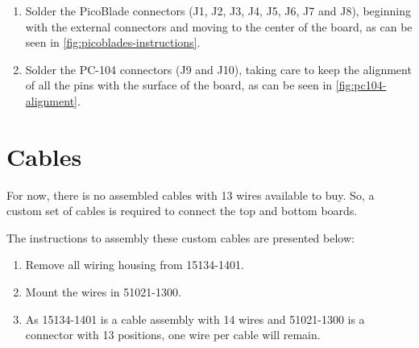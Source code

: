 \begin{enumerate}
    \item Solder the PicoBlade connectors (J1, J2, J3, J4, J5, J6, J7 and J8), beginning with the external connectors and moving to the center of the board, as can be seen in \autoref{fig:picoblades-instructions}.
    \item Solder the PC-104 connectors (J9 and J10), taking care to keep the alignment of all the pins with the surface of the board, as can be seen in \autoref{fig:pc104-alignment}.
\end{enumerate}

\section{Cables}

For now, there is no assembled cables with 13 wires available to buy. So, a custom set of cables is required to connect the top and bottom boards.

The instructions to assembly these custom cables are presented below:

\begin{enumerate}
    \item Remove all wiring housing from 15134-1401.
    \item Mount the wires in 51021-1300.
    \item As 15134-1401 is a cable assembly with 14 wires and 51021-1300 is a connector with 13 positions, one wire per cable will remain.
\end{enumerate}
